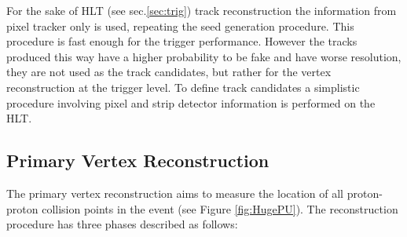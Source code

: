 For the sake of HLT (see sec.\ref{sec:trig}) track reconstruction the information from pixel tracker only is used, repeating the seed generation procedure\cite{Chatrchyan:2014fea}.
This procedure is fast enough for the trigger performance. However the tracks produced this way have a higher probability to be fake and have worse resolution, they
are not used as the track candidates, but rather for the vertex reconstruction at the trigger level. To define track candidates a simplistic procedure
involving pixel and strip detector information is performed on the HLT\cite{Chatrchyan:2014fea}.

\subsection{Primary Vertex Reconstruction}\label{ssec:vtxReco}

The primary vertex reconstruction aims to measure the location of all proton-proton collision points in the event (see Figure \ref{fig:HugePU}). The reconstruction procedure has three
phases described as follows\cite{Chatrchyan:2014fea}:

